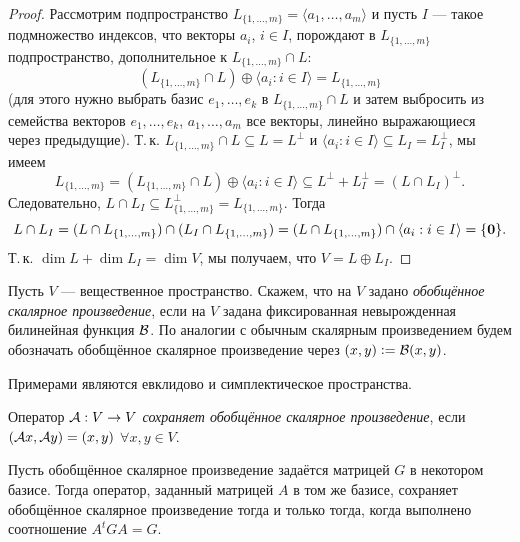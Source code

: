 \begin{proof}
    Рассмотрим подпространство $L_{\{1, \ldots, m\}} = \langle a_1, \ldots, a_m\rangle$ и пусть $I$ --- такое подмножество индексов, что векторы $a_i$, $i \in I$, порождают в $L_{\{1, \ldots, m\}}$ подпространство, дополнительное к $L_{\{1, \ldots, m\}} \cap L$:
    \[
        (L_{\{1, \ldots, m\}} \cap L) \oplus \langle a_i : i \in I\rangle = L_{\{1, \ldots, m\}}
    \]
    (для этого нужно выбрать базис $e_1, \ldots, e_k$ в $L_{\{1, \ldots, m\}} \cap L$ и затем выбросить из семейства векторов $e_1, \ldots, e_k$, $a_1, \ldots, a_m$ все векторы, линейно выражающиеся через предыдущие). Т.\,к. $L_{\{1, \ldots, m\}} \cap L \subseteq L = L^\perp$ и $\langle a_i : i \in I\rangle \subseteq L_I = L_I^\perp$, мы имеем
    \[
        L_{\{1, \ldots, m\}} = (L_{\{1, \ldots, m\}} \cap L) \oplus \langle a_i : i \in I\rangle \subseteq L^\perp + L_I^\perp = (L \cap L_I)^\perp.
    \]
    Следовательно, $L \cap L_I \subseteq L_{\{1, \ldots, m\}}^\perp = L_{\{1, \ldots, m\}}$. Тогда
    \[
        L \cap L_I = (L \cap L_{\{1, \ldots, m\}}) \cap (L_I \cap L_{\{1, \ldots, m\}}) = (L \cap L_{\{1, \ldots, m\}}) \cap \langle a_i : i \in I\rangle = \{\boldsymbol{0}\}.
    \]
    Т.\,к. $\dim L + \dim L_I = \dim V$, мы получаем, что $V = L \oplus L_I$.
\end{proof}

\begin{definition}
    Пусть $V$ --- вещественное пространство. Скажем, что на $V$ задано \textit{обобщённое скалярное произведение}, если на $V$ задана фиксированная невырожденная билинейная функция $\mathcal{B}$. По аналогии с обычным скалярным произведением будем обозначать обобщённое скалярное произведение через $(x, y) \vcentcolon = \mathcal{B}(x, y)$.
\end{definition}

Примерами являются евклидово и симплектическое пространства.

\begin{definition}
    Оператор $\mathcal{A}: V \to V$ \textit{сохраняет обобщённое скалярное произведение}, если $(\mathcal{A} x, \mathcal{A} y) = (x, y)$ $\forall x, y \in V$.
\end{definition}

\begin{proposal}
    Пусть обобщённое скалярное произведение задаётся матрицей $G$ в некотором базисе. Тогда оператор, заданный матрицей $A$ в том же базисе, сохраняет обобщённое скалярное произведение тогда и только тогда, когда выполнено соотношение $A^tGA = G$.
\end{proposal}


